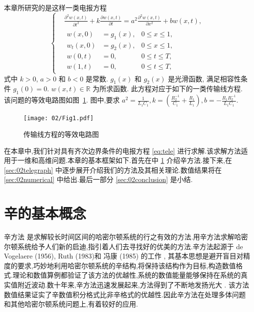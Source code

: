 本章所研究的是这样一类电报方程
\begin{equation}\label{eq:tele}
\left\lbrace
\begin{aligned}
&\frac{\partial ^2 w(x,t)}{\partial t^2}+k\frac{\partial w(x,t)}{\partial t}=a^2 \frac{\partial ^2 w(x,t)}{\partial x^2} + b w(x,t),\\
&\begin{aligned}
w(x,0)&=g_1(x),&0 \le x \le 1,\\
w_t(x,0)&=g_2(x),&0 \le x \le 1,\\
w(0,t)&=0,&0 \le t \le T,\\
w(1,t)&=0,&0 \le t \le T,
\end{aligned}
\end{aligned}
\right.
\end{equation}
式中 $k > 0$, $a>0$ 和 $b < 0$ 是常数. $g_1(x)$ 和 $g_2(x)$ 是光滑函数, 满足相容性条件 $g_1(0)=0$. $w(x,t) \in \mathbb{R}$ 为所求函数. 此方程对应于如下的一类传输线方程. 该问题的等效电路图如图~\ref{fig:tele1}. 图中,要求 $a^2 = \frac{1}{L_1C_1}, k= (\frac{R_2^{-1}}{C_1}+\frac{R_1}{L_1}), b =-\frac{R_1R_2^{-1}}{L_1C_1}$.
\begin{figure}[h]
    \centering
    \texttt{[image: 02/Fig1.pdf]}
    \caption{传输线方程的等效电路图}
    \label{fig:tele1}
\end{figure}

在本章中,我们针对具有齐次边界条件的电报方程 \eqref{eq:tele} 进行求解.该求解方法适用于一维和高维问题.本章的基本框架如下.首先在中 \ref{sec:02symplectic} 介绍辛方法.接下来,在 \ref{sec:02telegraph} 中逐步展开介绍我们的方法及其相关理论.数值结果将在 \ref{sec:02numerical} 中给出.最后一部分 \ref{sec:02conclusion} 是小结.

\section{辛的基本概念}\label{sec:02symplectic}
辛方法 \cite{feng2010symplectic} 是求解较长时间区间的哈密尔顿系统的行之有效的方法.用辛方法求解哈密尔顿系统给予人们新的启迪,指引着人们去寻找好的优美的方法.辛方法起源于 de Vogelaere (1956), Ruth (1983)和 冯康 (1985) 的工作 \cite{hairer2006geometric}, 其基本思想是避开盲目对精度的要求,巧妙地利用哈密尔顿系统的辛结构,将保持该结构作为目标,构造数值格式.理论和数值算例都验证了该方法的优越性,系统的数值能量能够保持在系统的真实值附近波动.数十年来,辛方法迅速发展起来,方法得到了不断地发扬光大 \cite{calvo1994numerical,leimkuhler2004simulating,hong2006multi,yang2009extended,monovasilis2013exponentially,xin2016birkhoffian,michalas2016numerical,liao2016multi}. 该方法数值结果证实了辛数值积分格式比非辛格式的优越性.因此辛方法在处理多体问题和其他哈密尔顿系统问题上,有着较好的应用.


